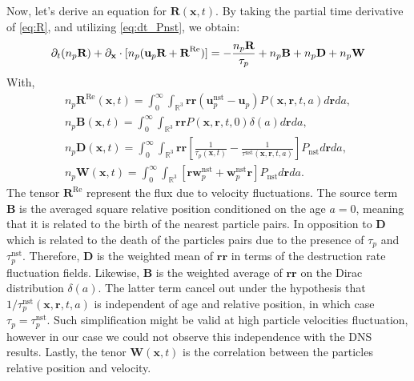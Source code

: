Now, let's derive an equation for $\textbf{R}(\textbf{x},t)$.
By taking the partial time derivative of \ref{eq:R}, and utilizing \ref{eq:dt_Pnst}, we obtain:
\begin{equation*}
    \partial_t (n_p\textbf{R})
    + \partial_\textbf{x} \cdot [n_p(\textbf{u}_p\textbf{R}
    + \textbf{R}^\text{Re})]
    = 
    - \frac{n_p\textbf{R}}{\tau_p}
    +n_p\textbf{B}
    + n_p\textbf{D}
    + n_p\textbf{W}
    \label{eq:dt_R}
\end{equation*}
With,
\begin{align*}
    n_p \textbf{R}^\text{Re}(\textbf{x},t)
    =
    \int_{0}^\infty
    \int_{\mathbb{R}^3}
    \textbf{rr}(\textbf{u}^\text{nst}_p - \textbf{u}_p)
    P(\textbf{x},\textbf{r},t,a)
    d\textbf{r}da,\\
    n_p \textbf{B}(\textbf{x},t)
    =
    \int_{0}^\infty
    \int_{\mathbb{R}^3}
    \textbf{rr}
    P(\textbf{x},\textbf{r},t,0)\delta(a)
    d\textbf{r}da, \\
    n_p\textbf{D}(\textbf{x},t) = 
    \int_{0}^\infty
    \int_{\mathbb{R}^3} \textbf{rr}
    \left[
        \frac{1}{\tau_p(\textbf{x},t)}
        - \frac{1}{\tau^\text{nst}(\textbf{x},\textbf{r},t,a)}
    \right]
    P_\text{nst}
    d\textbf{r}
    da,\\
    n_p \textbf{W}(\textbf{x},t) = 
    \int_{0}^\infty
    \int_{\mathbb{R}^3} \left[
        \textbf{r} \textbf{w}^\text{nst}_p
        + \textbf{w}^\text{nst}_p\textbf{r}
    \right]P_\text{nst}
    d\textbf{r}
    da.
\end{align*} 
The tensor $\textbf{R}^\text{Re}$ represent the flux due to velocity fluctuations. 
The source term $\textbf{B}$ is the averaged square relative position conditioned on the age $a=0$, meaning that it is related to the birth of the nearest particle pairs. 
In opposition to \textbf{D} which is related to the death of the particles pairs due to the presence of $\tau_p$ and $\tau_p^\text{nst}$.
Therefore, $\textbf{D}$ is the weighted mean of $\textbf{rr}$ in terms of the destruction rate fluctuation fields. 
Likewise, $\textbf{B}$ is the weighted average of $\textbf{rr}$ on the Dirac distribution $\delta(a)$. 
The latter term cancel out under the hypothesis that $1 / \tau^\text{nst}_p(\textbf{x},\textbf{r},t,a)$ is independent of age and relative position, in which case $\tau_p = \tau^\text{nst}_p$. 
Such simplification might be valid at high particle velocities fluctuation, however in our case we could not observe this independence with the DNS results.  
Lastly, the tenor $\textbf{W}(\textbf{x},t)$ is the correlation between the particles relative position and velocity.
